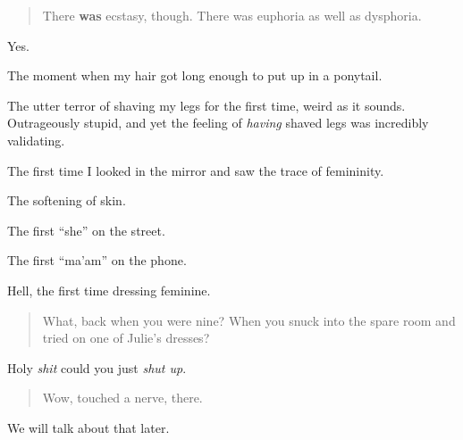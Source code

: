 \begin{quote}
There \textbf{was} ecstasy, though. There was euphoria as well as dysphoria.
\end{quote}

Yes.

The moment when my hair got long enough to put up in a ponytail.

The utter terror of shaving my legs for the first time, weird as it sounds. Outrageously stupid, and yet the feeling of \emph{having} shaved legs was incredibly validating.

The first time I looked in the mirror and saw the trace of femininity.

The softening of skin.

The first ``she'' on the street.

The first ``ma'am'' on the phone.

Hell, the first time dressing feminine.

\begin{quote}
What, back when you were nine? When you snuck into the spare room and tried on one of Julie's dresses?
\end{quote}

Holy \emph{shit} could you just \emph{shut up}.

\begin{quote}
Wow, touched a nerve, there.
\end{quote}

We will talk about that later.
